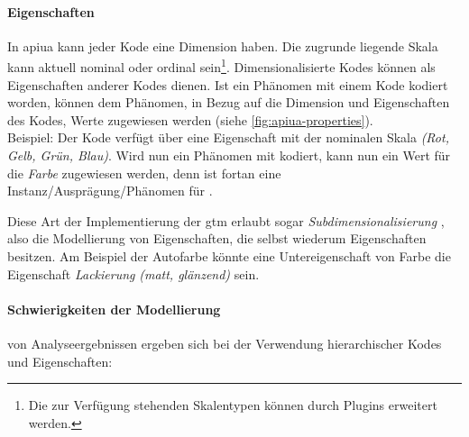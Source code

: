 \paragraph{Eigenschaften}
In \gls{apiua} kann jeder Kode eine Dimension haben. Die zugrunde liegende Skala kann aktuell nominal oder ordinal sein\footnote{Die zur Verfügung stehenden Skalentypen können durch Plugins erweitert werden.}. Dimensionalisierte Kodes können als Eigenschaften anderer Kodes dienen. Ist ein Phänomen mit einem Kode kodiert worden, können dem Phänomen, in Bezug auf die Dimension und Eigenschaften des Kodes, Werte zugewiesen werden (siehe \autoref{fig:apiua-properties}).
\\Beispiel: Der Kode  verfügt über eine Eigenschaft  mit der nominalen Skala \textit{(Rot, Gelb, Grün, Blau)}. Wird nun ein Phänomen  mit  kodiert, kann  nun ein Wert für die \textit{Farbe} zugewiesen werden, denn  ist fortan eine Instanz/Ausprägung/Phänomen für .

Diese Art der Implementierung der \gls{gtm} erlaubt sogar \textit{Subdimensionalisierung} \citep{strauss1987qualitative}, also die Modellierung von Eigenschaften, die selbst wiederum Eigenschaften besitzen. Am Beispiel der Autofarbe könnte eine Untereigenschaft von Farbe die Eigenschaft \textit{Lackierung} \textit{(matt, glänzend)} sein.

\paragraph{Schwierigkeiten der Modellierung} von Analyseergebnissen ergeben sich bei der Verwendung hierarchischer Kodes und Eigenschaften:

